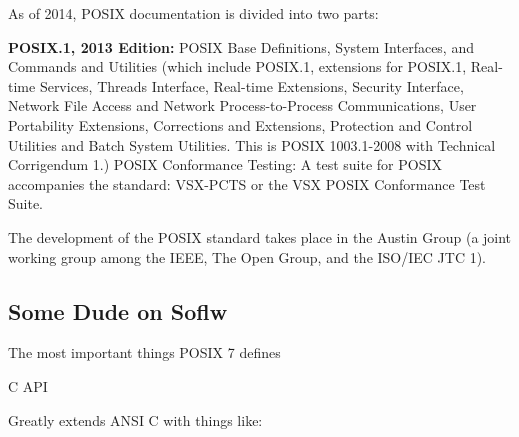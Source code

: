 As of 2014, POSIX documentation is divided into two parts:



	\textbf{POSIX.1, 2013 Edition:} POSIX Base Definitions, System Interfaces,
	and Commands and Utilities (which include POSIX.1, extensions for POSIX.1,
	Real-time Services, Threads Interface, Real-time Extensions, Security
	Interface, Network File Access and Network Process-to-Process
	Communications, User Portability Extensions, Corrections and Extensions,
	Protection and Control Utilities and Batch System Utilities. This is POSIX
	1003.1-2008 with Technical Corrigendum 1.) POSIX Conformance Testing: A test
	suite for POSIX accompanies the standard: VSX-PCTS or the VSX POSIX
	Conformance Test Suite.



The development of the POSIX standard takes place in the Austin Group (a joint
working group among the IEEE, The Open Group, and the ISO/IEC JTC 1). 



\subsectionend

\subsection{Some Dude on Soflw}
\label{ssec:some_dude_on_soflw}

The most important things POSIX 7 defines


    C API



Greatly extends ANSI C with things like:

